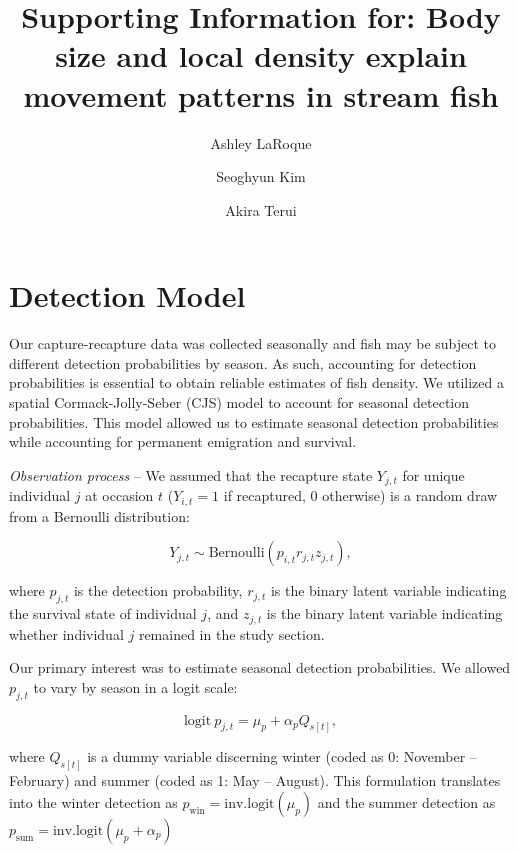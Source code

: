 \documentclass[11pt, class=article, crop=false]{standalone}
\title{Supporting Information for: Body size and local density explain movement patterns in stream fish }
\date{} %
\author[1]{Ashley LaRoque}
\author[2]{Seoghyun Kim}
\author[1]{Akira Terui}
\affil[1]{Depatment of Biology, University of North Carolina at Greensboro}
\affil[2]{Department of Biological Sciences, Kangwon National University}
\begin{document}
\maketitle

\section{Detection Model}

Our capture-recapture data was collected seasonally and fish may be subject to different detection probabilities by season.
As such, accounting for detection probabilities is essential to obtain reliable estimates of fish density.
We utilized a spatial Cormack-Jolly-Seber (CJS) model \citep{schaubEstimatingTrueInstead2014} to account for seasonal detection probabilities. 
This model allowed us to estimate seasonal detection probabilities while accounting for permanent emigration and survival.

\textit{Observation process} -- 
We assumed that the recapture state $Y_{j,t}$ for unique individual $j$ at occasion $t$ ($Y_{i,t} = 1$ if recaptured, $0$ otherwise) is a random draw from a Bernoulli distribution:

\begin{equation}
    Y_{j,t} \sim \text{Bernoulli}(p_{i,t} r_{j, t} z_{j,t}),
\end{equation}

where $p_{j,t}$ is the detection probability, $r_{j, t}$ is the binary latent variable indicating the survival state of individual $j$, and $z_{j, t}$ is the binary latent variable indicating whether individual $j$ remained in the study section.

Our primary interest was to estimate seasonal detection probabilities.
We allowed $p_{j, t}$ to vary by season in a logit scale:

\begin{equation}
    \text{logit}~p_{j,t} = \mu_p + \alpha_p Q_{s[t]},
\end{equation}

where $Q_{s[t]}$ is a dummy variable discerning winter (coded as 0: November -- February) and summer (coded as 1: May -- August).
This formulation translates into the winter detection as $p_{\text{win}} = \text{inv.logit}(\mu_p)$ and the summer detection as $p_{\text{sum}} = \text{inv.logit}(\mu_p + \alpha_p)$

\end{document}
